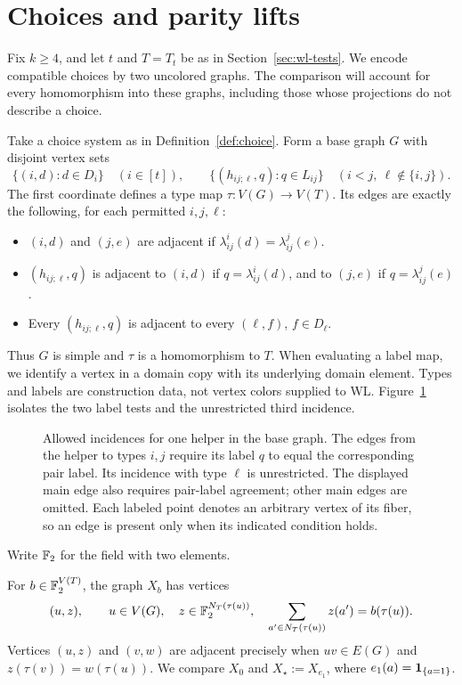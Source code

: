 \section{Choices and parity lifts}\label{sec:parity-lifts}

Fix \(k\ge4\), and let \(t\) and \(T=T_t\) be as in
Section~\ref{sec:wl-tests}. We encode compatible choices by two uncolored
graphs. The comparison will account for every homomorphism into these
graphs, including those whose projections do not describe a choice.

Take a choice system as in Definition~\ref{def:choice}. Form a base graph \(G\) with disjoint vertex sets
\[
 \{(i,d):d\in D_i\}\quad(i\in[t]),\qquad
 \{(h_{ij;\ell},q):q\in L_{ij}\}
 \quad(i<j,\ \ell\notin\{i,j\}).
\]
The first coordinate defines a type map \(\tau:V(G)\to V(T)\).
Its edges are exactly the following, for each permitted \(i,j,\ell\):
\begin{itemize}[nosep]
\item \((i,d)\) and \((j,e)\) are adjacent if
  \(\lambda_{ij}^i(d)=\lambda_{ij}^j(e)\).
\item \((h_{ij;\ell},q)\) is adjacent to \((i,d)\) if
  \(q=\lambda_{ij}^i(d)\), and to \((j,e)\) if
  \(q=\lambda_{ij}^j(e)\).
\item Every \((h_{ij;\ell},q)\) is adjacent to every
  \((\ell,f)\), \(f\in D_\ell\).
\end{itemize}
Thus \(G\) is simple and \(\tau\) is a homomorphism to \(T\).
When evaluating a label map, we identify a vertex in a domain copy
with its underlying domain element. Types and labels are construction
data, not vertex colors supplied to WL. Figure~\ref{fig:helper-incidence}
isolates the two label tests and the unrestricted third incidence.

\begin{figure}[H]
\centering

\caption{Allowed incidences for one helper in the base graph. The edges
from the helper to types \(i,j\) require its label \(q\) to equal the
corresponding pair label. Its incidence with type \(\ell\) is unrestricted.
The displayed main edge also requires pair-label agreement; other main
edges are omitted. Each labeled point denotes an arbitrary vertex of
its fiber, so an edge is present only when its indicated condition holds.}
\label{fig:helper-incidence}
\end{figure}

Write \(\mathbb F_2\) for the field with two elements.
\begin{definition}\label{def:lifts}
For \(b\in\mathbb F_2^{V(T)}\), the graph \(X_b\) has vertices
\[
 (u,z),\qquad
 u\in V(G),\quad z\in\mathbb F_2^{N_T(\tau(u))},\quad
 \sum_{a'\in N_T(\tau(u))}z(a')=b(\tau(u)).
\]
Vertices \((u,z)\) and \((v,w)\) are adjacent precisely when
\(uv\in E(G)\) and \(z(\tau(v))=w(\tau(u))\).
We compare \(X_0\) and \(X_\star:=X_{e_1}\), where
\(e_1(a)=\mathbf 1_{\{a=1\}}\).
\end{definition}

